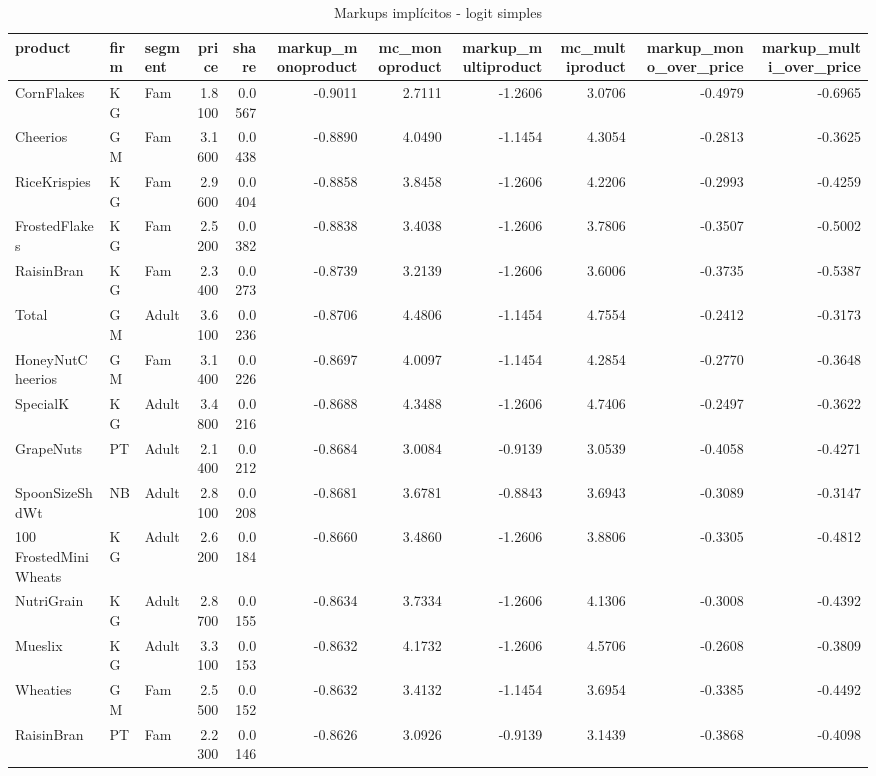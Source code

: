\begin{table}[!htbp]
\centering
\caption{Markups implícitos - logit simples}
\label{tab:markups}
\small
\begin{tabular}{lllrrrrrrrr}
\toprule
product & firm & segment & price & share & markup_monoproduct & mc_monoproduct & markup_multiproduct & mc_multiproduct & markup_mono_over_price & markup_multi_over_price \\
\midrule
CornFlakes & KG & Fam & 1.8100 & 0.0567 & -0.9011 & 2.7111 & -1.2606 & 3.0706 & -0.4979 & -0.6965 \\
Cheerios & GM & Fam & 3.1600 & 0.0438 & -0.8890 & 4.0490 & -1.1454 & 4.3054 & -0.2813 & -0.3625 \\
RiceKrispies & KG & Fam & 2.9600 & 0.0404 & -0.8858 & 3.8458 & -1.2606 & 4.2206 & -0.2993 & -0.4259 \\
FrostedFlakes & KG & Fam & 2.5200 & 0.0382 & -0.8838 & 3.4038 & -1.2606 & 3.7806 & -0.3507 & -0.5002 \\
RaisinBran & KG & Fam & 2.3400 & 0.0273 & -0.8739 & 3.2139 & -1.2606 & 3.6006 & -0.3735 & -0.5387 \\
Total & GM & Adult & 3.6100 & 0.0236 & -0.8706 & 4.4806 & -1.1454 & 4.7554 & -0.2412 & -0.3173 \\
HoneyNutCheerios & GM & Fam & 3.1400 & 0.0226 & -0.8697 & 4.0097 & -1.1454 & 4.2854 & -0.2770 & -0.3648 \\
SpecialK & KG & Adult & 3.4800 & 0.0216 & -0.8688 & 4.3488 & -1.2606 & 4.7406 & -0.2497 & -0.3622 \\
GrapeNuts & PT & Adult & 2.1400 & 0.0212 & -0.8684 & 3.0084 & -0.9139 & 3.0539 & -0.4058 & -0.4271 \\
SpoonSizeShdWt & NB & Adult & 2.8100 & 0.0208 & -0.8681 & 3.6781 & -0.8843 & 3.6943 & -0.3089 & -0.3147 \\
100%
FrostedMiniWheats & KG & Adult & 2.6200 & 0.0184 & -0.8660 & 3.4860 & -1.2606 & 3.8806 & -0.3305 & -0.4812 \\
NutriGrain & KG & Adult & 2.8700 & 0.0155 & -0.8634 & 3.7334 & -1.2606 & 4.1306 & -0.3008 & -0.4392 \\
Mueslix & KG & Adult & 3.3100 & 0.0153 & -0.8632 & 4.1732 & -1.2606 & 4.5706 & -0.2608 & -0.3809 \\
Wheaties & GM & Fam & 2.5500 & 0.0152 & -0.8632 & 3.4132 & -1.1454 & 3.6954 & -0.3385 & -0.4492 \\
RaisinBran & PT & Fam & 2.2300 & 0.0146 & -0.8626 & 3.0926 & -0.9139 & 3.1439 & -0.3868 & -0.4098 \\

\end{tabular}
\end{table}
